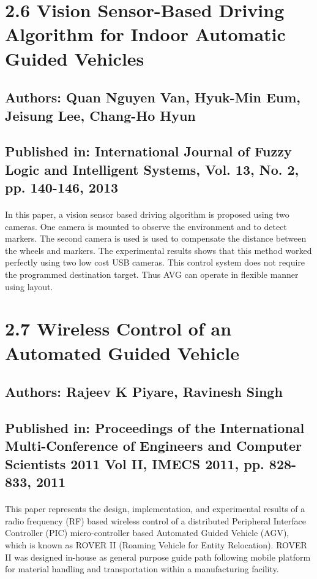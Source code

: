 \section*{2.6 Vision Sensor-Based Driving Algorithm for Indoor Automatic Guided Vehicles\cite{QVan}}
\subsection*{Authors: Quan Nguyen Van, Hyuk-Min Eum, Jeisung Lee, Chang-Ho Hyun}
\subsection*{Published in: International Journal of Fuzzy Logic and Intelligent Systems, Vol. 13, No. 2, pp. 140-146, 2013}
\paragraph{}In this paper, a vision sensor based driving algorithm is proposed using two cameras. One camera is mounted to observe the environment and to detect markers. The second camera is used is used to compensate the distance between the wheels and markers. The experimental results shows that this method worked perfectly using two low cost USB cameras. This control system does not require the programmed destination target. Thus AVG can operate in flexible manner using layout.

\section*{2.7 Wireless Control of an Automated Guided Vehicle\cite{RPiyare}}
\subsection*{Authors: Rajeev K Piyare, Ravinesh Singh}
\subsection*{Published in: Proceedings of the International Multi-Conference of Engineers and Computer Scientists 2011 Vol II, IMECS 2011, pp. 828-833, 2011}
\paragraph{}This paper represents the design, implementation, and experimental results of a radio frequency (RF) based wireless control of a distributed Peripheral Interface Controller (PIC) micro-controller based Automated Guided Vehicle (AGV), which is known as ROVER II (Roaming Vehicle for Entity Relocation). ROVER II was designed in-house as general purpose guide path following mobile platform for material handling and transportation within a manufacturing facility.

